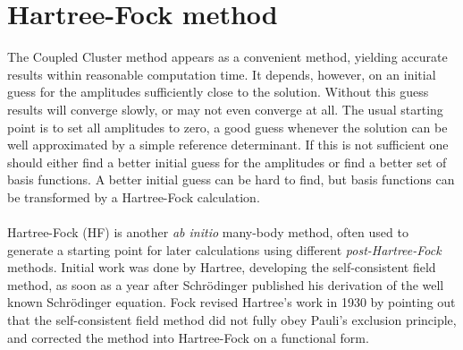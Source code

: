 \section{Hartree-Fock method}
The Coupled Cluster method appears as a convenient method, yielding accurate results within reasonable computation time.
It depends, however, on an initial guess for the amplitudes sufficiently close to the solution.
Without this guess results will converge slowly, or may not even converge at all.
The usual starting point is to set all amplitudes to zero, a good guess whenever the solution can be well approximated by a simple reference determinant.
If this is not sufficient one should either find a better initial guess for the amplitudes or find a better set of basis functions.
A better initial guess can be hard to find, but basis functions can be transformed by a Hartree-Fock calculation.

\paragraph*{}
Hartree-Fock (HF) is another \textit{ab initio} many-body method, often used to generate a starting point for later calculations using different \textit{post-Hartree-Fock} methods.
Initial work was done by Hartree, developing the self-consistent field method, as soon as a year after Schrödinger published his derivation of the well known Schrödinger equation.
Fock revised Hartree's work in 1930 by pointing out that the self-consistent field method did not fully obey Pauli's exclusion principle, and corrected the method into Hartree-Fock on a functional form.

